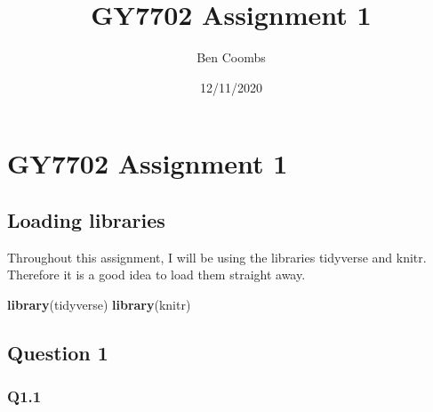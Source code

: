 \documentclass[
]{article}
\title{GY7702 Assignment 1}
\author{Ben Coombs}
\date{12/11/2020}
\newenvironment{Shaded}{\begin{snugshade}}{\end{snugshade}}
\newcommand{\KeywordTok}[1]{\textcolor[rgb]{0.13,0.29,0.53}{\textbf{#1}}}
\newcommand{\NormalTok}[1]{#1}
\begin{document}
\maketitle

\hypertarget{gy7702-assignment-1}{%
\section{\texorpdfstring{\textbf{GY7702 Assignment
1}}{GY7702 Assignment 1}}\label{gy7702-assignment-1}}

\hypertarget{loading-libraries}{%
\subsection{Loading libraries}\label{loading-libraries}}

Throughout this assignment, I will be using the libraries tidyverse and
knitr. Therefore it is a good idea to load them straight away.

\begin{Shaded}
\begin{Highlighting}[]
\KeywordTok{library}\NormalTok{(tidyverse)}
\KeywordTok{library}\NormalTok{(knitr)}
\end{Highlighting}
\end{Shaded}

\hypertarget{question-1}{%
\subsection{Question 1}\label{question-1}}

\hypertarget{q1.1}{%
\subsubsection{Q1.1}\label{q1.1}}
\end{document}
